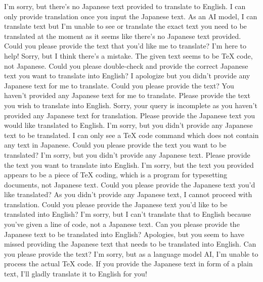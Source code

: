 {%
I'm sorry, but there's no Japanese text provided to translate to English. I can only provide translation once you input the Japanese text.
As an AI model, I can translate text but I'm unable to see or translate the exact text you need to be translated at the moment as it seems like there's no Japanese text provided. Could you please provide the text that you'd like me to translate? I'm here to help!
Sorry, but I think there's a mistake. The given text seems to be TeX code, not Japanese. Could you please double-check and provide the correct Japanese text you want to translate into English?
I apologize but you didn't provide any Japanese text for me to translate. Could you please provide the text?
You haven't provided any Japanese text for me to translate. Please provide the text you wish to translate into English.
Sorry, your query is incomplete as you haven't provided any Japanese text for translation. Please provide the Japanese text you would like translated to English.
I'm sorry, but you didn't provide any Japanese text to be translated. I can only see a TeX code command which does not contain any text in Japanese. Could you please provide the text you want to be translated?
I'm sorry, but you didn't provide any Japanese text. Please provide the text you want to translate into English.
I'm sorry, but the text you provided appears to be a piece of TeX coding, which is a program for typesetting documents, not Japanese text. Could you please provide the Japanese text you'd like translated?
As you didn't provide any Japanese text, I cannot proceed with translation. Could you please provide the Japanese text you'd like to be translated into English?
I'm sorry, but I can't translate that to English because you've given a line of code, not a Japanese text. Can you please provide the Japanese text to be translated into English?
Apologies, but you seem to have missed providing the Japanese text that needs to be translated into English. Can you please provide the text?
I'm sorry, but as a language model AI, I'm unable to process the actual TeX code. If you provide the Japanese text in form of a plain text, I'll gladly translate it to English for you!
}
